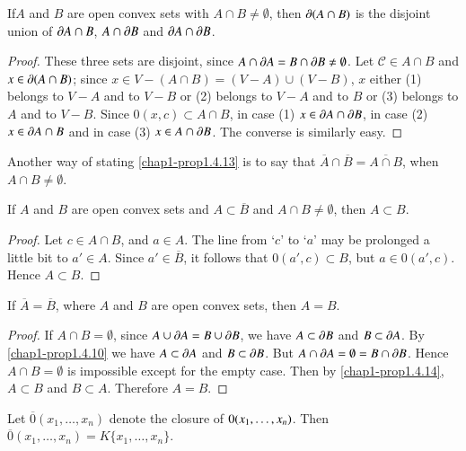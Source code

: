 \begin{proposition}\label{chap1-prop1.4.13}
If\pageoriginale $A$ and $B$ are open convex sets with $A\cap B\neq \emptyset$, then $\partial(A\cap B)$ is the disjoint union of $\partial A\cap B$, $A\cap \partial B$ and $\partial A\cap \partial B$.
\end{proposition}

\begin{proof}
These three sets are disjoint, since $A\cap \partial A=B\cap \partial B\neq \emptyset$. Let $\mathscr{C} \in A \cap B$ and $x\in \partial(A\cap B)$; since $x\in V-(A\cap B)=(V-A)\cup (V-B)$, $x$ either (1) belongs to $V-A$ and to $V-B$ or (2) belongs to $V-A$ and to $B$ or (3) belongs to $A$ and to $V-B$. Since $0(x,c)\subset A\cap B$, in case (1) $x\in \partial A\cap \partial B$, in case (2) $x\in \partial A\cap B$ and in case (3) $x\in A\cap \partial B$. The converse is similarly easy. 
\end{proof}

Another way of stating \ref{chap1-prop1.4.13} is to say that $\overline{A}\cap \overline{B}=\overline{A\cap B}$, when $A\cap B\neq \emptyset$.

\begin{proposition}\label{chap1-prop1.4.14}
If $A$ and $B$ are open convex sets and $A\subset \overline{B}$ and $A\cap B\neq \emptyset$, then $A\subset B$.
\end{proposition}

\begin{proof}
Let $c\in A\cap B$, and $a\in A$. The line from `$c$' to `$a$' may be prolonged a little bit to $a'\in A$. Since $a'\in \overline{B}$, it follows that $0(a',c)\subset B$, but $a\in 0(a',c)$. Hence $A\subset B$.
\end{proof}

\begin{proposition}\label{chap1-prop1.4.15}
If $\overline{A}=\overline{B}$, where $A$ and $B$ are open convex sets, then $A=B$. 
\end{proposition}

\begin{proof}
If $A\cap B=\emptyset$, since $A\cup \partial A=B\cup \partial B$, we have $A\subset \partial B$ and $B\subset \partial A$. By \ref{chap1-prop1.4.10} we have $A\subset \partial A$ and $B\subset \partial B$. But $A\cap \partial A=\emptyset =B\cap\partial B$. Hence $A\cap B=\emptyset$ is impossible except for the empty case. Then by  \ref{chap1-prop1.4.14}, $A\subset B$ and $B\subset A$. Therefore $A=B$.
\end{proof}

\begin{proposition}\label{chap1-prop1.4.16}
Let \; $\overline{0}(x_{1},\ldots,x_{n})$ denote the closure of
$0(x_{1},\ldots,\break x_{n})$. Then $\overline{0}(x_{1},\ldots,x_{n})=K\{x_{1},\ldots,x_{n}\}$. 
\end{proposition}


